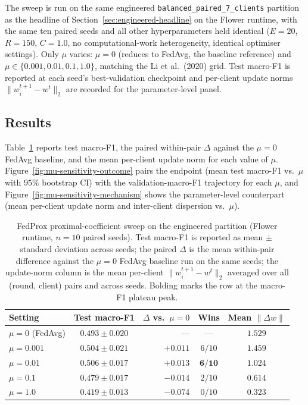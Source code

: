 \documentclass[11pt,a4paper]{report}
\begin{document}
The sweep is run on the same engineered
\texttt{balanced\_paired\_7\_clients} partition as the headline of
Section~\ref{sec:engineered-headline} on the Flower runtime, with
the same ten paired seeds and all other hyperparameters held
identical ($E = 20$, $R = 150$, $C = 1.0$, no computational-work
heterogeneity, identical optimiser settings). Only $\mu$ varies:
$\mu = 0$ (reduces to FedAvg, the baseline reference) and
$\mu \in \{0.001, 0.01, 0.1, 1.0\}$, matching the Li et al.\
(2020) grid. Test macro-F1 is reported at each seed's
best-validation checkpoint and per-client update norms
$\lVert w_i^{t+1} - w^t \rVert_2$ are recorded for the
parameter-level panel.

\subsection{Results}
\label{sec:mu-sensitivity-results}

Table~\ref{tab:mu-sensitivity} reports test macro-F1, the paired
within-pair $\Delta$ against the $\mu = 0$ FedAvg baseline, and the
mean per-client update norm for each value of $\mu$.
Figure~\ref{fig:mu-sensitivity-outcome} pairs the endpoint
(mean test macro-F1 vs.\ $\mu$ with $95\%$ bootstrap CI) with the
validation-macro-F1 trajectory for each $\mu$, and
Figure~\ref{fig:mu-sensitivity-mechanism} shows the parameter-level
counterpart (mean per-client update norm and inter-client
dispersion vs.\ $\mu$).

\begin{table}[!htbp]
\centering
\caption{FedProx proximal-coefficient sweep on the engineered
partition (Flower runtime, $n = 10$ paired seeds). Test macro-F1
is reported as mean $\pm$ standard deviation across seeds; the
paired $\Delta$ is the mean within-pair difference against the
$\mu = 0$ FedAvg baseline run on the same seeds; the update-norm
column is the mean per-client $\lVert w_i^{t+1} - w^t \rVert_2$
averaged over all (round, client) pairs and across seeds. Bolding
marks the row at the macro-F1 plateau peak.}
\label{tab:mu-sensitivity}
\small
\setlength{\tabcolsep}{5pt}
\renewcommand{\arraystretch}{1.15}
\begin{tabular}{@{}l c r c c@{}}
\toprule
Setting             & Test macro-F1      & $\Delta$ vs.\ $\mu = 0$ & Wins  & Mean $\lVert \Delta w \rVert$ \\
\midrule
$\mu = 0$ (FedAvg)  & $0.493 \pm 0.020$  & ---                      & ---    & $1.529$ \\
$\mu = 0.001$       & $0.504 \pm 0.021$  & $+0.011$                 & $6/10$ & $1.459$ \\
$\mu = 0.01$        & $\mathbf{0.506 \pm 0.017}$ & $\mathbf{+0.013}$ & $\mathbf{6/10}$ & $\mathbf{1.024}$ \\
$\mu = 0.1$         & $0.479 \pm 0.017$  & $-0.014$                 & $2/10$ & $0.614$ \\
$\mu = 1.0$         & $0.419 \pm 0.013$  & $-0.074$                 & $0/10$ & $0.323$ \\
\bottomrule
\end{tabular}
\end{table}
\end{document}
